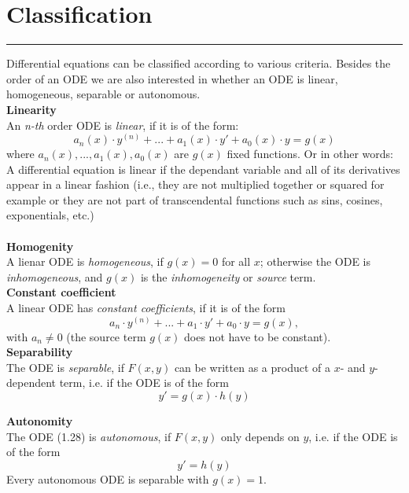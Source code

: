 \section{Classification}
\noindent\rule[\linienAbstand]{\linewidth}{\linienDickeDick}

Differential equations can be classified according to various criteria. Besides the order of an ODE we are also interested in whether an ODE is linear, homogeneous, separable or autonomous.\\

\textbf{Linearity}\\
An \emph{n-th} order ODE is \emph{linear}, if it is of the form:
\begin{equation}
  a_n(x) \cdot y^{(n)} + ... + a_1(x) \cdot y' + a_0(x) \cdot y = g(x)
\end{equation}
where $a_n(x), ..., a_1(x), a_0(x)$ are $g(x)$ fixed functions. Or in other words: A differential equation is linear if the dependant variable and all of its derivatives appear in a linear fashion (i.e., they are not multiplied together or squared for example or they are not part of transcendental functions such as sins, cosines, exponentials, etc.)\\\\

\textbf{Homogenity}\\
A lienar ODE is \emph{homogeneous}, if $g(x) = 0$ for all $x$; otherwise the ODE is \emph{inhomogeneous}, and $g(x)$ is the \emph{inhomogeneity} or \emph{source} term.\\

\textbf{Constant coefficient}\\
A linear ODE has \emph{constant coefficients}, if it is of the form
\begin{equation}
  a_n \cdot y^{(n)} + ... + a_1 \cdot y'+ a_0 \cdot y = g(x),
\end{equation}
with $a_n \neq 0$ (the source term $g(x)$ does not have to be constant).\\

\textbf{Separability}\\
The ODE is \emph{separable}, if $F(x, y)$ can be written as a product of a $x$- and $y$-dependent term, i.e. if the ODE is of the form
\begin{equation}
  y' = g(x) \cdot h(y)
\end{equation}

\textbf{Autonomity}\\
The ODE (1.28) is \emph{autonomous}, if $F(x, y)$ only depends on $y$, i.e. if the ODE is of the form
\begin{equation}
  y' = h(y)
\end{equation}
Every autonomous ODE is separable with $g(x) = 1$.\\

